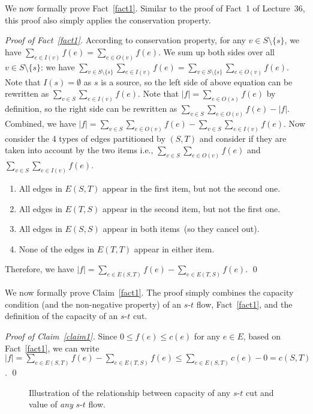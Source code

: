 We now formally prove Fact~\ref{fact1}. 
Similar to the proof of Fact~1 of Lecture~36, this proof also simply applies the conservation property.

\emph{Proof of Fact~\ref{fact1}.} According to conservation property, for any $v\in S\setminus \{s\}$,
we have $\sum_{e\in I(v)} f(e) = \sum_{e\in O(v)} f(e)$. 
We sum up both sides over all $v\in S\setminus\{s\}$: 
we have $\sum_{v\in S\setminus\{s\}} \sum_{e\in I(v)} f(e) = \sum_{v\in S\setminus\{s\}} \sum_{e\in O(v)} f(e)$. 
Note that $I(s) = \emptyset$ as $s$ is a source, so the left side of above equation can be rewritten as $\sum_{v\in S} \sum_{e\in I(v)} f(e)$.
Note that $|f| = \sum_{e\in O(s)} f(e)$ by definition, so the right side can be rewritten as $\sum_{v\in S} \sum_{e\in O(v)} f(e) - |f|$.
Combined, we have $|f| = \sum_{v\in S} \sum_{e\in O(v)} f(e) - \sum_{v\in S} \sum_{e\in I(v)} f(e)$. 
Now consider the 4 types of edges partitioned by $(S, T)$ and consider if they are taken into account by the two items
i.e., $\sum_{v\in S} \sum_{e\in O(v)} f(e)$ and $\sum_{v\in S} \sum_{e\in I(v)} f(e)$. 
\vspace*{-\topsep}
\begin{enumerate}
\item All edges in $E(S, T)$ appear in the first item, but not the second one.
\item All edges in $E(T, S)$ appear in the second item, but not the first one.
\item All edges in $E(S, S)$ appear in both items~(so they cancel out).
\item None of the edges in $E(T, T)$ appear in either item.
\end{enumerate}
Therefore, we have $|f| = \sum_{e\in E(S, T)} f(e) - \sum_{e\in E(T, S)} f(e)$. \qed

We now formally prove Claim~\ref{fact1}. The proof simply combines the capacity condition (and the non-negative property) of an $s$-$t$ flow,
Fact~\ref{fact1}, and the definition of the capacity of an $s$-$t$ cut.

\emph{Proof of Claim~\ref{claim1}.} Since $0\le f(e) \le c(e)$ for any $e\in E$,
based on Fact~\ref{fact1}, we can write
$|f| = \sum_{e\in E(S, T)} f(e) - \sum_{e\in E(T, S)} f(e)
\le \sum_{e\in E(S, T)} c(e) - 0 = c(S, T)$. \qed

\begin{figure}[!b]
\centering{}
\caption{Illustration of the relationship between capacity of any $s$-$t$ cut
and value of \emph{any} $s$-$t$ flow.}
\label{fig:flow-meet}
\end{figure}

